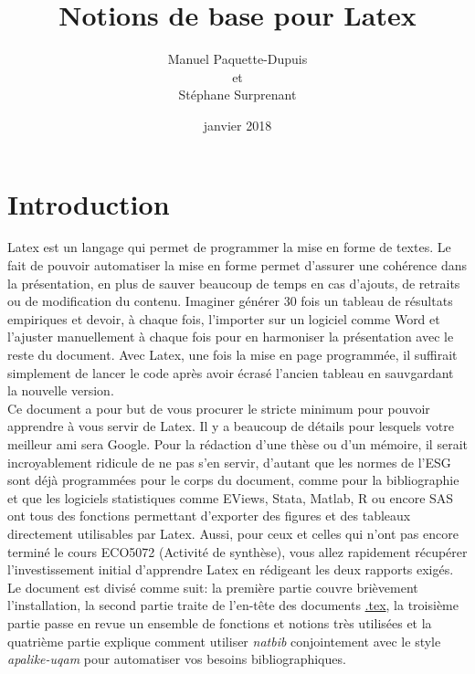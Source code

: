 \documentclass[12pt]{article}
\title{Notions de base pour Latex}
\author{Manuel Paquette-Dupuis \\
		    et \\
		    Stéphane Surprenant}
\date{janvier 2018}
\begin{document}
	
	\maketitle
	\thispagestyle{empty}
	
	\newpage
	\tableofcontents
	
	\newpage
	\section*{Introduction}
	\doublespacing
	
   Latex est un langage qui permet de programmer la mise en forme de textes. Le fait de pouvoir automatiser la mise en forme permet d'assurer une cohérence dans la présentation, en plus de sauver beaucoup de temps en cas d'ajouts, de retraits ou de modification du contenu. Imaginer générer 30 fois un tableau de résultats empiriques et devoir, à chaque fois, l'importer sur un logiciel comme Word et l'ajuster manuellement à chaque fois pour en harmoniser la présentation avec le reste du document. Avec Latex, une fois la mise en page programmée, il suffirait simplement de lancer le code après avoir écrasé l'ancien tableau en sauvgardant la nouvelle version. \\ 

   Ce document a pour but de vous procurer le stricte minimum pour pouvoir apprendre à vous servir de Latex. Il y a beaucoup de détails pour lesquels votre meilleur ami sera Google. Pour la rédaction d'une thèse ou d'un mémoire, il serait incroyablement ridicule de ne pas s'en servir, d'autant que les normes de l'ESG sont déjà programmées pour le corps du document, comme pour la bibliographie et que les logiciels statistiques comme EViews, Stata, Matlab, R ou encore SAS ont tous des fonctions permettant d'exporter des figures et des tableaux directement utilisables par Latex. Aussi, pour ceux et celles qui n'ont pas encore terminé le cours ECO5072 (Activité de synthèse), vous allez rapidement récupérer l'investissement initial d'apprendre Latex en rédigeant les deux rapports exigés. \\
   
   Le document est divisé comme suit: la première partie couvre brièvement l'installation, la second partie traite de l'en-tête des documents \url{.tex}, la troisième partie passe en revue un ensemble de fonctions et notions très utilisées et la quatrième partie explique comment utiliser \textit{natbib} conjointement avec le style \textit{apalike-uqam} pour automatiser vos besoins bibliographiques.
   
\end{document}
